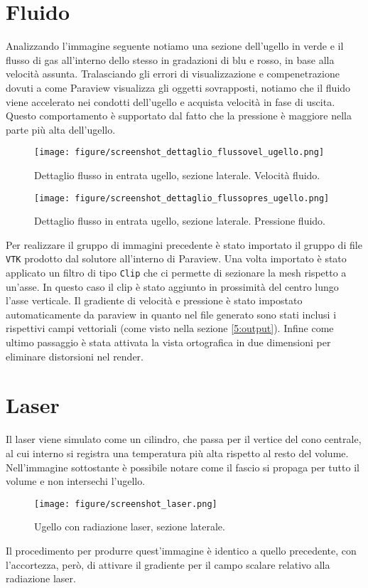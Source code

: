 \section{Fluido}
Analizzando l'immagine seguente notiamo una sezione dell'ugello in verde e il flusso di gas all'interno dello stesso in gradazioni di blu e rosso, in base alla velocità assunta.
Tralasciando gli errori di visualizzazione e compenetrazione dovuti a come Paraview visualizza gli oggetti sovrapposti, notiamo che il fluido viene accelerato nei condotti dell'ugello
e acquista velocità in fase di uscita. Questo comportamento è supportato dal fatto che la pressione è maggiore nella parte più alta dell'ugello.
\begin{figure}[H]\label{dettaglio_flusso}
    \centering
    \texttt{[image: figure/screenshot\_dettaglio\_flussovel\_ugello.png]}
    \caption{Dettaglio flusso in entrata ugello, sezione laterale. Velocità fluido.}
\end{figure}
\begin{figure}[H]\label{dettaglio_flusso}
    \centering
    \texttt{[image: figure/screenshot\_dettaglio\_flussopres\_ugello.png]}
    \caption{Dettaglio flusso in entrata ugello, sezione laterale. Pressione fluido.}
\end{figure}
Per realizzare il gruppo di immagini precedente è stato importato il gruppo di file \texttt{VTK} prodotto dal solutore all'interno di Paraview. 
Una volta importato è stato applicato un filtro di tipo \texttt{Clip} che ci permette di sezionare la mesh rispetto a un'asse. 
In questo caso il clip è stato aggiunto in prossimità del centro lungo l'asse verticale. Il gradiente di velocità e pressione è stato impostato automaticamente 
da paraview in quanto nel file generato sono stati inclusi i rispettivi campi vettoriali (come visto nella sezione \ref*{5:output}). Infine come ultimo passaggio è stata 
attivata la vista ortografica in due dimensioni per eliminare distorsioni nel render.

\section{Laser}
Il laser viene simulato come un cilindro, che passa per il vertice del cono centrale, al cui interno si registra una temperatura più alta rispetto al resto del volume.
Nell'immagine sottostante è possibile notare come il fascio si propaga per tutto il volume e non intersechi l'ugello.
\begin{figure}[H]
    \centering
    \texttt{[image: figure/screenshot\_laser.png]}
    \caption{Ugello con radiazione laser, sezione laterale.}
\end{figure}
Il procedimento per produrre quest'immagine è identico a quello precedente, con l'accortezza, però, di attivare il gradiente per il campo scalare relativo alla radiazione laser.


